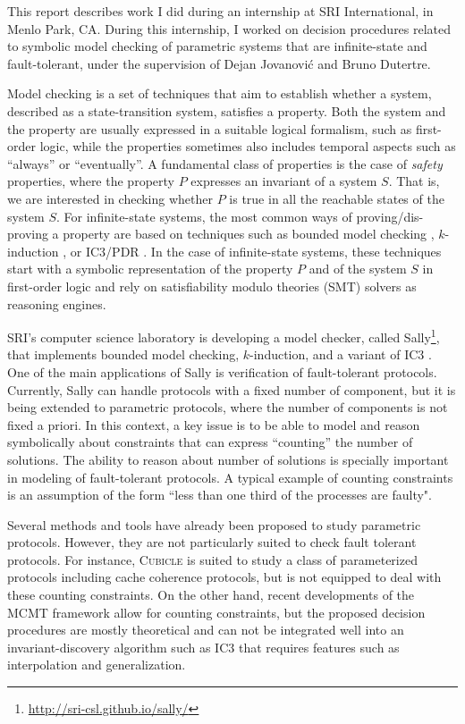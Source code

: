 
This report describes work I did during an internship at SRI
International, in Menlo Park, CA. During this internship, I worked on
decision procedures related to symbolic model checking of parametric
systems that are infinite-state and fault-tolerant, under the
supervision of Dejan Jovanović and Bruno Dutertre.

Model checking is a set of techniques that aim to establish whether a
system, described as a state-transition system, satisfies a property.
Both the system and the property are usually expressed in a suitable
logical formalism, such as first-order logic, while the properties
sometimes also includes temporal aspects such as ``always'' or
``eventually''. A fundamental class of properties is the case of
\emph{safety} properties, where the property $P$ expresses an
invariant of a system $S$. That is, we are interested in checking
whether $P$ is true in all the reachable states of the system $S$. For
infinite-state systems, the most common ways of proving/dis-proving a
property are based on techniques such as bounded model checking
\cite{bmc}, $k$-induction \cite{kind}, or IC3/PDR \cite{pdr}. In the
case of infinite-state systems, these techniques start with a
symbolic representation of the property $P$ and of the system $S$ in
first-order logic and rely on satisfiability modulo theories (SMT)
solvers \cite{smt} as reasoning engines.

SRI's computer science laboratory is developing a model checker,
called Sally\footnote{\url{http://sri-csl.github.io/sally/}}, that
implements bounded model checking, $k$-induction, and a variant of IC3
\cite{pdkind}. One of the main applications of Sally is  verification
of fault-tolerant protocols. Currently, Sally can handle protocols
with a fixed number of component, but it is being extended to
parametric protocols, where the number of components is not fixed a
priori. In this context, a key issue is to be able to model and reason
symbolically about constraints that can express ``counting'' the
number of solutions. The ability to reason about number of solutions
is specially important in modeling of fault-tolerant protocols. A
typical example of counting constraints is an assumption of the form
``less than one third of the processes are faulty".

Several methods and tools have already been proposed to study
parametric protocols. However, they are not particularly suited to
check fault tolerant protocols. For instance, \textsc{Cubicle}
\cite{ConchonGKMZ12} is suited to study a class of parameterized
protocols including cache coherence protocols, but is not equipped to
deal with these counting constraints. On the other hand, recent
developments of the MCMT framework \cite{mcmtcounting} allow for
counting constraints, but the proposed decision procedures are mostly
theoretical and can not be integrated well into an invariant-discovery
algorithm such as IC3 that requires features such as interpolation and
generalization.

